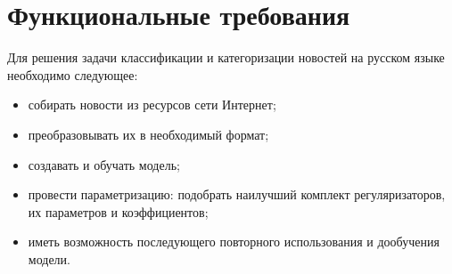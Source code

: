 %
\section{Функциональные требования}

Для решения задачи классификации и категоризации новостей на русском языке необходимо следующее: 

\begin{itemize}
    \item собирать новости из ресурсов сети Интернет;
    \item преобразовывать их в необходимый формат;
    \item создавать и обучать модель;
    \item провести параметризацию: подобрать наилучший комплект регуляризаторов, их параметров и коэффициентов;
    \item иметь возможность последующего повторного использования и дообучения модели.
\end{itemize}
